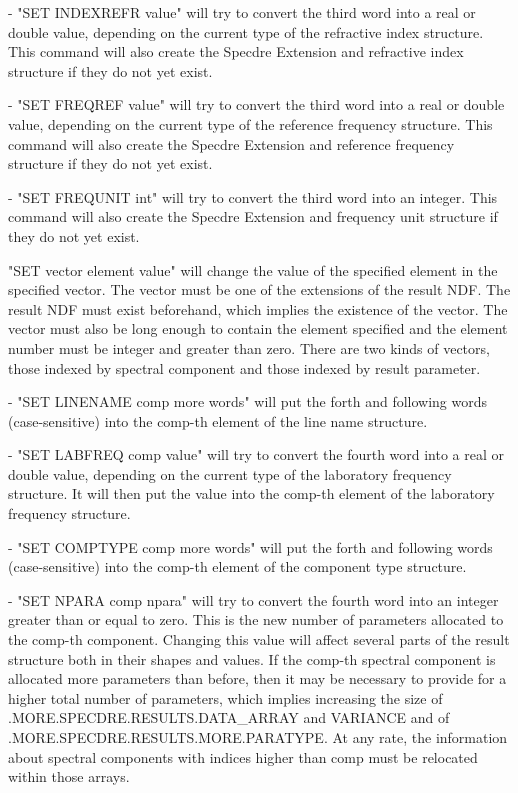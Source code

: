 \begin{description}
\begin{description}
   -  "SET INDEXREFR value" will try to convert the third word
      into a real or double value, depending on the current type
      of the refractive index structure. This command will also
      create the Specdre Extension and refractive index structure
      if they do not yet exist.

   -  "SET FREQREF value" will try to convert the third word
      into a real or double value, depending on the current type
      of the reference frequency structure. This command will also
      create the Specdre Extension and reference frequency
      structure if they do not yet exist.

   -  "SET FREQUNIT int" will try to convert the third word into
      an integer. This command will also create the Specdre
      Extension and frequency unit structure if they do not yet
      exist.

   "SET vector element value" will change the value of the
   specified element in the specified vector. The vector must be
   one of the extensions of the result NDF. The result NDF must
   exist beforehand, which implies the existence of the vector.
   The vector must also be long enough to contain the element
   specified and the element number must be integer and greater
   than zero. There are two kinds of vectors, those indexed by
   spectral component and those indexed by result parameter.

   -  "SET LINENAME comp more words" will put the forth and
      following words (case-sensitive) into the comp-th element
      of the line name structure.

   -  "SET LABFREQ comp value" will try to convert the fourth
      word into a real or double value, depending on the current
      type of the laboratory frequency structure. It will then put
      the value into the comp-th element of the laboratory
      frequency structure.

   -  "SET COMPTYPE comp more words" will put the forth and
      following words (case-sensitive) into the comp-th element
      of the component type structure.

   -  "SET NPARA comp npara" will try to convert the fourth word
      into an integer greater than or equal to zero. This is the
      new number of parameters allocated to the comp-th component.
      Changing this value will affect several parts of the result
      structure both in their shapes and values. If the comp-th
      spectral component is allocated more parameters than before,
      then it may be necessary to provide for a higher total
      number of parameters, which implies increasing the size of
      .MORE.SPECDRE.RESULTS.DATA\_ARRAY and VARIANCE and of
      .MORE.SPECDRE.RESULTS.MORE.PARATYPE. At any rate, the
      information about spectral components with indices higher
      than comp must be relocated within those arrays.


\end{description}
\end{description}
